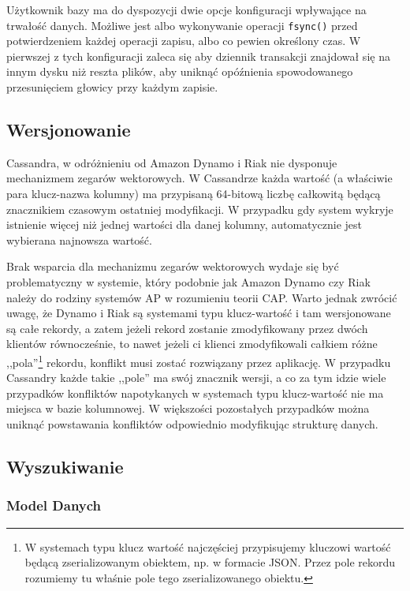 Użytkownik bazy ma do dyspozycji dwie opcje konfiguracji wpływające na trwałość danych.
Możliwe jest albo wykonywanie operacji \verb+fsync()+ przed potwierdzeniem każdej operacji zapisu, albo co pewien określony czas.
W pierwszej z tych konfiguracji zaleca się aby dziennik transakcji znajdował się na innym dysku niż reszta plików, aby uniknąć opóźnienia spowodowanego przesunięciem głowicy przy każdym zapisie.

\subsection*{Wersjonowanie}

Cassandra, w odróżnieniu od Amazon Dynamo i Riak nie dysponuje mechanizmem zegarów wektorowych.
W Cassandrze każda wartość (a właściwie para klucz-nazwa kolumny) ma przypisaną 64-bitową liczbę całkowitą będącą znacznikiem czasowym ostatniej modyfikacji.
W przypadku gdy system wykryje istnienie więcej niż jednej wartości dla danej kolumny, automatycznie jest wybierana najnowsza wartość.

Brak wsparcia dla mechanizmu zegarów wektorowych wydaje się być problematyczny w systemie, który podobnie jak Amazon Dynamo czy Riak należy do rodziny systemów AP w rozumieniu teorii CAP.
Warto jednak zwrócić uwagę, że Dynamo i Riak są systemami typu klucz-wartość i tam wersjonowane są całe rekordy, a zatem jeżeli rekord zostanie zmodyfikowany przez dwóch klientów równocześnie, to nawet jeżeli ci klienci zmodyfikowali całkiem różne ,,pola''\footnote{W systemach typu klucz wartość najczęściej przypisujemy kluczowi wartość będącą zserializowanym obiektem, np. w formacie JSON. Przez pole rekordu rozumiemy tu właśnie pole tego zserializowanego obiektu.} rekordu, konflikt musi zostać rozwiązany przez aplikację.
W przypadku Cassandry każde takie ,,pole'' ma swój znacznik wersji, a co za tym idzie wiele przypadków konfliktów napotykanych w systemach typu klucz-wartość nie ma miejsca w bazie kolumnowej.
W większości pozostałych przypadków można uniknąć powstawania konfliktów odpowiednio modyfikując strukturę danych.

\subsection*{Wyszukiwanie}

\subsubsection*{Model Danych}

